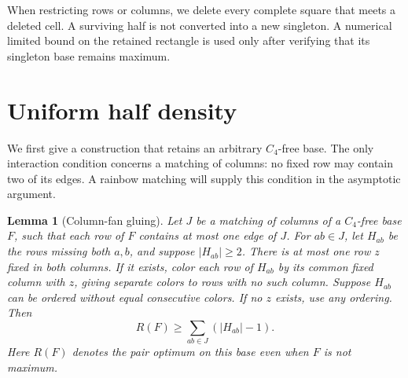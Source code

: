 \documentclass[11pt,a4paper]{article}
\newtheorem{lemma}[theorem]{Lemma}
\theoremstyle{definition}
\begin{document}
When restricting rows or columns, we delete every complete square that
meets a deleted cell. A surviving half is not converted into a new
singleton. A numerical limited bound on the retained rectangle is used
only after verifying that its singleton base remains maximum.

\section{Uniform half density}\label{sec:uniform-density}

We first give a construction that retains an arbitrary $C_4$-free base.
The only interaction condition concerns a matching of columns: no fixed
row may contain two of its edges. A rainbow matching will supply this
condition in the asymptotic argument.

\begin{lemma}[Column-fan gluing]\label{lem:column-fans}
Let $J$ be a matching of columns of a $C_4$-free base $F$, such that each
row of $F$ contains at most one edge of $J$. For $ab\in J$, let $H_{ab}$
be the rows missing both $a,b$, and suppose $|H_{ab}|\ge2$.
There is at most one row $z$ fixed in both columns. If it exists, color
each row of $H_{ab}$ by its common fixed column with $z$, giving separate
colors to rows with no such column. Suppose $H_{ab}$ can be ordered
without equal consecutive colors. If no $z$ exists, use any ordering.
Then
\[
 R(F)\ge\sum_{ab\in J}(|H_{ab}|-1).
\]
Here $R(F)$ denotes the pair optimum on this base even when $F$ is not maximum.
\end{lemma}
\end{document}
